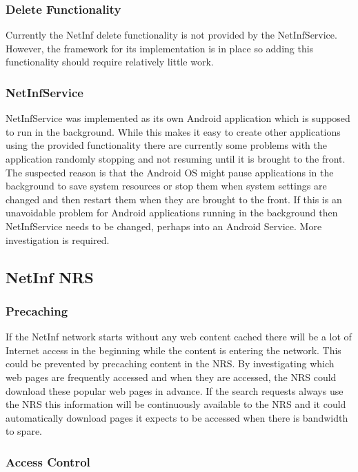 \subsubsection{Delete Functionality}

Currently the NetInf delete functionality is not provided by the NetInfService. However, the framework for its implementation is in place so adding this functionality should require relatively little work.

\subsubsection{NetInfService}

NetInfService was implemented as its own Android application which is supposed to run in the background. While this makes it easy to create other applications using the provided functionality there are currently some problems with the application randomly stopping and not resuming until it is brought to the front. The suspected reason is that the Android OS might pause applications in the background to save system resources or stop them when system settings are changed and then restart them when they are brought to the front. If this is an unavoidable problem for Android applications running in the background then NetInfService needs to be changed, perhaps into an Android Service. More investigation is required.

\subsection{NetInf NRS}

\subsubsection{Precaching}

If the NetInf network starts without any web content cached there will be a lot of Internet access in the beginning while the content is entering the network. This could be prevented by precaching content in the NRS. By investigating which web pages are frequently accessed and when they are accessed, the NRS could download these popular web pages in advance. If the search requests always use the NRS this information will be continuously available to the NRS and it could automatically download pages it expects to be accessed when there is bandwidth to spare.

\subsubsection{Access Control}

